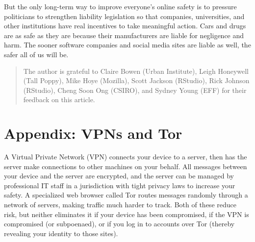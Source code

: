 \documentclass[10pt,letterpaper]{article}
\begin{document}
But the only long-term way to improve everyone's online safety
is to pressure politicians to strengthen liability legislation
so that companies, universities, and other institutions have real incentives to take meaningful action.
Cars and drugs are as safe as they are because their manufacturers are liable for negligence and harm.
The sooner software companies and social media sites are liable as well,
the safer all of us will be.

\begin{quote}
  The author is grateful to Claire Bowen (Urban Institute),
  Leigh Honeywell (Tall Poppy),
  Mike Hoye (Mozilla),
  Scott Jackson (RStudio),
  Rick Johnson (RStudio),
  Cheng Soon Ong (CSIRO),
  and Sydney Young (EFF)
  for their feedback on this article.
\end{quote}



\section*{Appendix: VPNs and Tor}
  
A Virtual Private Network (VPN) connects your device to a server,
then has the server make connections to other machines on your behalf.
All messages between your device and the server are encrypted,
and the server can be managed by professional IT staff
in a jurisdiction with tight privacy laws
to increase your safety.
A specialized web browser called Tor routes messages randomly through a network of servers,
making traffic much harder to track.
Both of these reduce risk,
but neither eliminates it
if your device has been compromised,
if the VPN is compromised (or subpoenaed),
or if you log in to accounts over Tor
(thereby revealing your identity to those sites).
\end{document}
